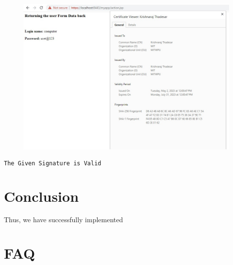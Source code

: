 \documentclass[11pt]{article}
\begin{document}
\begin{figure}[H]
    \centering
    \includegraphics[width=.95\textwidth]{tomcat3.jpeg}
    \caption{}
\end{figure}
\begin{verbatim}
The Given Signature is Valid
\end{verbatim}


% 

\section{Conclusion}
Thus, we have successfully implemented
\clearpage

\section{FAQ}
\end{document}
